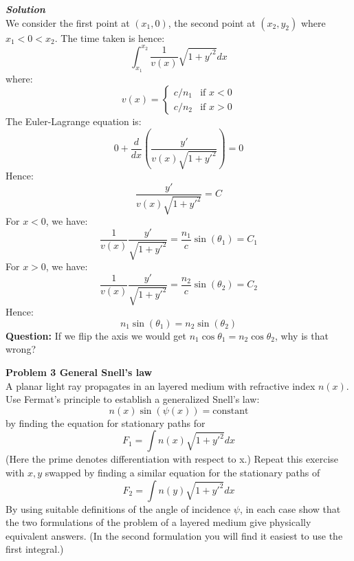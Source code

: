\begin{framed}
\textbf{\textit{Solution}}\\
We consider the first point at $(x_1, 0)$, the second point at $(x_2,y_2)$ where $x_1<0<x_2$. The time taken is hence:
\begin{equation}
\int_{x_1}^{x_2} \frac{1}{v(x)}\sqrt{1+y'^2}dx
\end{equation}
where:
\begin{equation}
v(x)=
\begin{cases}
    c/n_1 &\text{if } x<0 \\
    c/n_2 &\text{if } x>0
\end{cases}
\end{equation}
The Euler-Lagrange equation is:
\begin{equation}
0 + \frac{d}{dx}\left( \frac{y'}{v(x)\sqrt{1+y'^2}} \right)=0
\end{equation}
Hence:
\begin{equation}
\frac{y'}{v(x)\sqrt{1+y'^2}} =C
\end{equation}
For $x<0$, we have:
\begin{equation}
\frac{1}{v(x)}\frac{y'}{\sqrt{1+y'^2}} = \frac{n_1}{c}\sin(\theta_1) = C_1
\end{equation}
For $x>0$, we have:
\begin{equation}
\frac{1}{v(x)}\frac{y'}{\sqrt{1+y'^2}} = \frac{n_2}{c}\sin(\theta_2) = C_2
\end{equation}
Hence:
\begin{equation}
n_1\sin(\theta_1)=n_2\sin(\theta_2)
\end{equation}
\textbf{Question:} If we flip the axis we would get $n_1\cos\theta_1=n_2\cos\theta_2$, why is that wrong?
\end{framed}

\begin{framed}
\textbf{\textbf{Problem 3} General Snell's law}\\
A planar light ray propagates in an layered medium with refractive index $n(x)$. Use Fermat's principle to establish a generalized Snell's law:
\begin{equation}
n(x)\sin(\psi(x))=\text{constant}
\end{equation}
by finding the equation for stationary paths for
\begin{equation}
F_1=\int n(x)\sqrt{1+y'^2}dx
\end{equation}
(Here the prime denotes differentiation with respect to x.) Repeat this exercise with $x,y$ swapped by finding a similar equation for the stationary paths of
\begin{equation}
F_2=\int n(y)\sqrt{1+y'^2}dx
\end{equation}
By using suitable definitions of the angle of incidence $\psi$, in each case show that the two formulations of the problem of a layered medium give physically equivalent answers.
(In the second formulation you will find it easiest to use the first integral.)
\end{framed}

